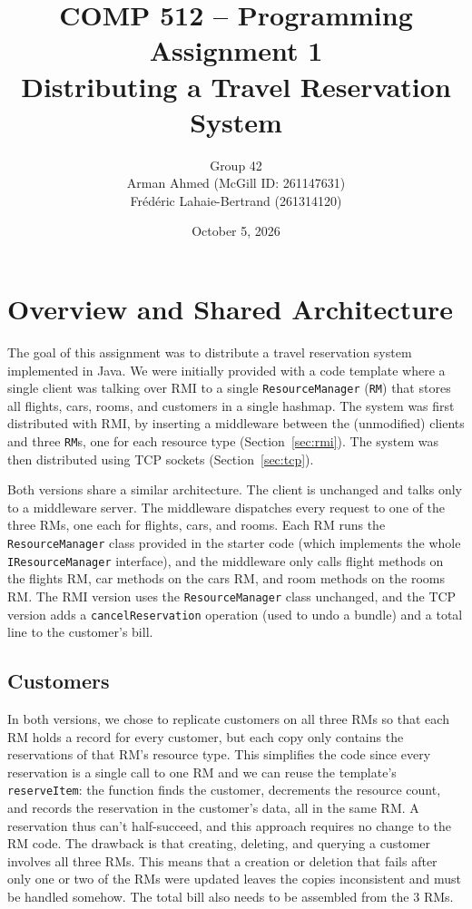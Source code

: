\documentclass[10pt]{article}
\title{COMP 512 -- Programming Assignment 1\\
  Distributing a Travel Reservation System}
\author{Group 42\\Arman Ahmed (McGill ID: 261147631)\\
  Frédéric Lahaie-Bertrand (261314120)}
\date{October 5, 2026}
\newcommand{\code}[1]{\lstinline{#1}}
\begin{document}
\maketitle

\section{Overview and Shared Architecture}

The goal of this assignment was to distribute a travel reservation system
implemented in Java. We were initially provided with a code template where a
single client was talking over RMI to a single \code{ResourceManager}
(\code{RM}) that stores all flights, cars, rooms, and customers in a single
hashmap. The system was first distributed with RMI, by inserting a middleware
between the (unmodified) clients and three \code{RM}s, one for each resource
type (Section~\ref{sec:rmi}). The system was then distributed using TCP sockets
(Section~\ref{sec:tcp}).

Both versions share a similar architecture. The client is unchanged and talks
only to a middleware server. The middleware dispatches every request to one of
the three RMs, one each for flights, cars, and rooms. Each RM runs the
\code{ResourceManager} class provided in the starter code (which implements the
whole \code{IResourceManager} interface), and the middleware only calls flight
methods on the flights RM, car methods on the cars RM, and room methods on the
rooms RM. The RMI version uses the \code{ResourceManager} class unchanged, and
the TCP version adds a \code{cancelReservation} operation (used to undo a
bundle) and a total line to the customer's bill.

\subsection{Customers}

In both versions, we chose to replicate customers on all three RMs so that each
RM holds a record for every customer, but each copy only contains the
reservations of that RM's resource type. This simplifies the code since every
reservation is a single call to one RM and we can reuse the template's
\code{reserveItem}: the function finds the customer, decrements the resource
count, and records the reservation in the customer's data, all in the same RM. A
reservation thus can't half-succeed, and this approach requires no change to the
RM code. The drawback is that creating, deleting, and querying a customer 
involves all three RMs. This means that a creation or deletion that fails after
only one or two of the RMs were updated leaves the copies inconsistent and must
be handled somehow. The total bill also needs to be assembled from the 3 RMs.
\end{document}
